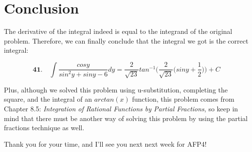 \section*{Conclusion}

The derivative of the integral indeed 
is equal to the integrand of the original problem. 
Therefore, we can finally conclude that the integral
we got is the correct integral:

\begin{equation*}
	\textbf{41.}\quad \int \frac{cosy}{sin^2y+siny-6} dy =	
	\frac{2}{\sqrt{23}} tan^{-1}\bigg(
	\frac{2}{\sqrt{23}}\big(
	siny+\frac{1}{2}
	\big)
	\bigg) + C
\end{equation*}

Plus, although we solved this problem
using u-substitution, completing the square,
and the integral of an $ arctan(x) $ function,
this problem comes from Chapter 8.5: 
\textit{Integration of Rational Functions
by Partial Fractions}, so keep in mind that
there must be another way of solving this problem by
using the partial fractions technique as well.

Thank you for your time, and I'll see you next next week
for AFP4!